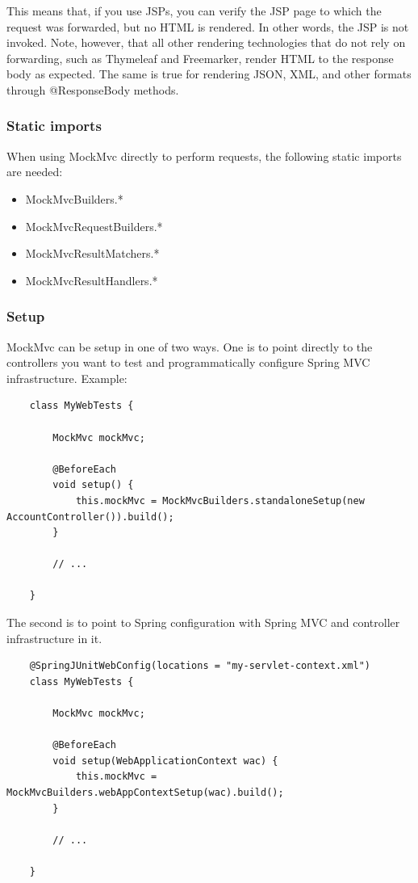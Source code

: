 \documentclass{scrartcl}
\begin{document}
This means that, if you use JSPs, you can verify the JSP page to which the request was forwarded, but no HTML is rendered. In other words, the JSP is not invoked. Note, however, that all other rendering technologies that do not rely on forwarding, such as Thymeleaf and Freemarker, render HTML to the response body as expected. The same is true for rendering JSON, XML, and other formats through @ResponseBody methods.

\subsubsection{Static imports}

When using MockMvc directly to perform requests, the following static imports are needed:

\begin{itemize}
    \item MockMvcBuilders.*

    \item MockMvcRequestBuilders.*

    \item MockMvcResultMatchers.*

    \item MockMvcResultHandlers.*
\end{itemize}

\subsubsection{Setup}

MockMvc can be setup in one of two ways. One is to point directly to the controllers you want to test and programmatically configure Spring MVC infrastructure. Example:

\begin{lstlisting}
    class MyWebTests {

        MockMvc mockMvc;

        @BeforeEach
        void setup() {
            this.mockMvc = MockMvcBuilders.standaloneSetup(new AccountController()).build();
        }

        // ...

    }
\end{lstlisting}

The second is to point to Spring configuration with Spring MVC and controller infrastructure in it.

\begin{lstlisting}
    @SpringJUnitWebConfig(locations = "my-servlet-context.xml")
    class MyWebTests {

        MockMvc mockMvc;

        @BeforeEach
        void setup(WebApplicationContext wac) {
            this.mockMvc = MockMvcBuilders.webAppContextSetup(wac).build();
        }

        // ...

    }
\end{lstlisting}
\end{document}
